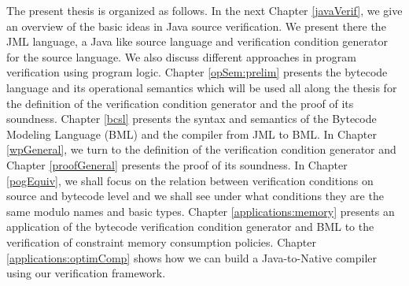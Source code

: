 The present thesis is organized as follows. In the next Chapter \ref{javaVerif}, we give an overview of
the basic ideas in Java source verification. We present there the JML language, a Java like source language and verification condition generator
for the source language. We also discuss different approaches in program verification using program logic.
Chapter \ref{opSem:prelim} presents
 the bytecode language and its operational semantics which will be used all along the thesis for the definition of the verification condition generator and the proof
of its soundness. 
Chapter \ref{bcsl} presents the syntax and semantics of the Bytecode Modeling Language (BML) and the compiler from JML to BML. 
In Chapter \ref{wpGeneral}, we turn to the definition of the verification condition generator and Chapter \ref{proofGeneral}
 presents the proof of its soundness. In Chapter \ref{pogEquiv}, we shall focus on the relation between 
verification conditions on source and bytecode level and we shall see under what conditions they are the same modulo names and basic types. 
Chapter \ref{applications:memory} presents an application of the bytecode verification condition generator and BML to the verification of constraint memory consumption
policies. Chapter \ref{applications:optimComp} shows how we can build a Java-to-Native compiler using our verification framework.




